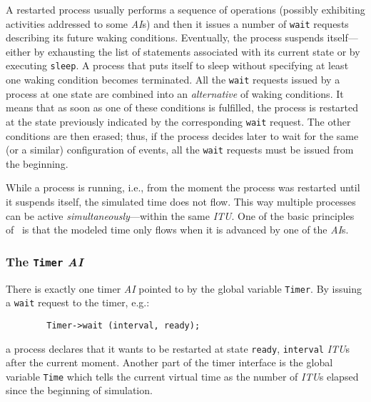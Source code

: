A restarted process usually performs a sequence of operations (possibly
exhibiting activities addressed to some {\em AI\/}s) and then it
issues a number of {\tt wait} requests describing its future waking
conditions.
Eventually, the process suspends itself---either by exhausting the list
of statements associated with its current state or by executing {\tt sleep}.
A process that puts itself to sleep without specifying at least one waking
condition becomes terminated.
All the {\tt wait} requests issued by a process at one state are combined into
an {\em alternative\/} of waking conditions.
It means that as soon as one of
these conditions is fulfilled, the process is restarted at the state previously
indicated by the corresponding {\tt wait} request.
The other conditions are then erased; thus,
if the process decides later to wait for the same (or a similar)
configuration of
events, all the {\tt wait} requests must be issued from the beginning.

While a process is running, i.e.,
from the moment the process was restarted until it suspends itself,
the simulated time does not flow.
This way multiple processes can be active {\em simultaneously\/}---within the
same {\em ITU}.
One of the basic principles of \smurph\ is that the modeled time only flows
when it is advanced by one of the {\em AI\/}s.

\subsubsection{The {\tt Timer} {\em AI}}

There is exactly one timer {\em AI\/} pointed to by the global variable
{\tt Timer}.
By issuing a
{\tt wait} request to the timer, e.g.:
{\small
\begin{verbatim}
        Timer->wait (interval, ready);
\end{verbatim} }
\noindent
a process declares that it
wants to be restarted at state {\tt ready}, {\tt interval}
{\em ITU\/}s after the current moment.
Another part of the timer interface is the global variable {\tt Time} which
tells the current virtual time as the number of {\em ITU\/}s elapsed since
the beginning of simulation.


